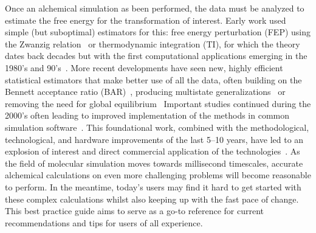 \documentclass[9pt,bestpractices]{livecoms}
\begin{document}
Once an alchemical simulation as been performed, the data must be analyzed to estimate the free energy for the transformation of interest.
Early work used simple (but suboptimal) estimators for this: free energy perturbation (FEP) using the Zwanzig relation~\cite{zwanzig1954hightemperature} or thermodynamic integration (TI), for which the theory dates back decades but with the first computational applications emerging in the 1980's and 90's~\cite{kirkwood1935statistical, jorgensen1985monte, kollman1993free, wong1986dynamics, merz1989free}. 
More recent developments have seen new, highly efficient statistical estimators that make better use of all the data, often building on the Bennett acceptance ratio (BAR)~\cite{bennett1976efficient}, producing multistate generalizations~\cite{mbar} or removing the need for global equilibrium~\cite{tram}
Important studies continued during the 2000's often leading to improved implementation of the methods in common simulation software~\cite{vanderspoel2005gromacs, mermelstein2018fast, wang2015accurate, hedges2019biosimspace}. 
This foundational work, combined with the methodological, technological, and hardware improvements of the last 5--10 years, have led to an explosion of interest and direct commercial application of the technologies~\cite{wang2015accurate, fratev2019improved, schindler2020largescale, cournia2017relative, sherborne2016collaborating}.
%
As the field of molecular simulation moves towards millisecond timescales, accurate alchemical calculations on even more challenging problems will become reasonable to perform. In the meantime, today's users may find it hard to get started with these complex calculations whilst also keeping up with the fast pace of change. This best practice guide aims to serve as a go-to reference for current recommendations and tips for users of all experience.  
%
\end{document}
